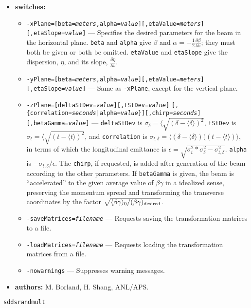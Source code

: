 \documentclass[11pt]{article}
\begin{document}
\begin{itemize}
\item {\bf switches:}
\begin{itemize}
\item {\tt -xPlane=[beta={\em meters},alpha={\em value}][,etaValue={\em meters}][,etaSlope={\em value}]} ---
        Specifies the desired parameters for the beam in the horizontal plane.  {\tt beta} and {\tt alpha} give
        $\beta$ and $\alpha = -\frac{1}{2}\frac{\partial \beta}{\partial s}$; they must both be given
        or both be omitted.  {\tt etaValue} and {\tt etaSlope} give the dispersion, $\eta$, and 
        its slope, $\frac{\partial \eta}{\partial s}$.
\item {\tt -yPlane=[beta={\em meters},alpha={\em value}][,etaValue={\em meters}][,etaSlope={\em value}]} ---
        Same as {\tt -xPlane}, except for the vertical plane.
\item {\tt -zPlane=[deltaStDev={\em value}][,tStDev={\em value}]}
  {\tt [,\{correlation={\em seconds}|alpha={\em value}\}][,chirp={\em seconds}][,betaGamma={\em value}]} ---
  {\tt deltaStDev} is $\sigma_\delta = \langle \sqrt{(\delta - \langle \delta \rangle)^2}$, 
  {\tt tStDev} is $\sigma_t = \langle \sqrt{(t - \langle t \rangle)^2}$,  and
  {\tt correlation} is $\sigma_{t,\delta} = \langle (\delta - \langle \delta \rangle)((t - \langle t \rangle)\rangle$, in terms of which
  the longitudinal emittance is $\epsilon = \sqrt{\sigma_t^2*\sigma_\delta^2 - \sigma_{t,\delta}^2}$.
  {\tt alpha} is $-\sigma_{t,\delta}/\epsilon$.
  The {\tt chirp}, if requested, is added after generation of the beam according to the other parameters.
  If {\tt betaGamma} is given, the beam is ``accelerated'' to the given average value of $\beta\gamma$ 
  in a idealized sense, preserving the momentum spread and transforming the transverse coordinates
  by the factor $\sqrt{\langle \beta\gamma\rangle_0/(\beta\gamma)_{\rm desired}}$.
\item {\tt -saveMatrices={\em filename}} --- Requests saving the transformation matrices to a file.
\item {\tt -loadMatrices={\em filename}} --- Requests loading the transformation matrices from a file.
\item {\tt -nowarnings} --- Suppresses warning messages.
\end{itemize}

\item {\bf authors:} M. Borland, H. Shang, ANL/APS.
\end{itemize}

\newpage
\begin{center}{\Large\verb|sddsrandmult|}\end{center}
\end{document}
